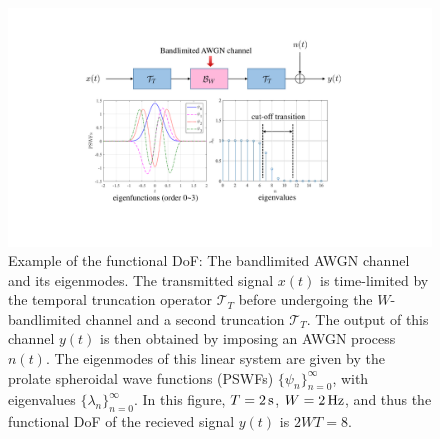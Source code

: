 \documentclass[journal,twocolumn]{IEEEtran}
\begin{document}
\begin{figure}
	\centering 
	\includegraphics[width=\linewidth]{figures/PSWFs.pdf} 
	\caption{Example of the functional DoF: The bandlimited AWGN channel and its eigenmodes. The transmitted signal $x(t)$ is time-limited by the temporal truncation operator $\mathcal{T}_T$ before undergoing the $W$-bandlimited channel and a second truncation $\mathcal{T}_T$. The output of this channel $y(t)$ is then obtained by imposing an AWGN process $n(t)$. The eigenmodes of this linear system are given by the prolate spheroidal wave functions (PSWFs) $\{\psi_n\}_{n=0}^{\infty}$, with eigenvalues $\{\lambda_n\}_{n=0}^{\infty}$. In this figure, $T=2\,{\rm s}$, $W=2\,{\rm Hz}$, and thus the functional DoF of the recieved signal $y(t)$ is $2WT=8$. }
	\label{fig:PSWF}
\end{figure}
\end{document}

